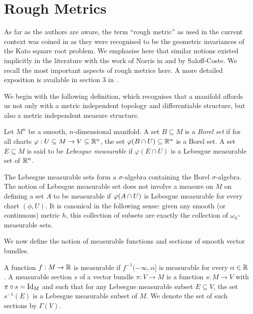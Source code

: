 \documentclass[a4paper, 12pt]{amsart}
\begin{document}
\section{Rough Metrics}
\label{sec:rough_metrics}

As far as the authors are aware, the term ``rough metric'' as used in the current context 
was coined in \cite{BRough} as they were 
recognised to be the geometric invariances of the Kato square root problem.
We emphasise here that similar notions existed implicitly in the 
literature with the work of Norris in \cite{Norris} 
and \cite{SC} by Saloff-Coste.
We recall the most important aspects of rough metrics here. 
A more detailed exposition is available in section 3 in \cite{BRough}.

We begin with the following definition, which recognises
that a manifold affords us not only with a metric independent 
topology and differentiable structure, but also a metric independent measure
structure.

\begin{defn}
\label{defn:borel_lebesgue}
Let \(M^n\) be a smooth, \(n\)-dimensional manifold. A set \(B \subseteq M\) is a \emph{Borel set} if for all charts \(\varphi : U \subseteq M \to V \subseteq \mathbb{R}^n\), the set \(\varphi(B \cap U) \subseteq \mathbb{R}^n\) is a Borel set. A set \(E \subseteq M\) is said to be \emph{Lebesgue measurable} if \(\varphi(E \cap U)\) is a Lebesgue measurable set of \(\mathbb{R}^n\).
\end{defn}

\begin{rem}
The Lebesgue measurable sets form a \(\sigma\)-algebra containing the Borel \(\sigma\)-algebra. The notion of Lebesgue measurable set does not involve a measure on \(M\)  on defining a set $A$ to be measurable if $\varphi(A \cap U)$ is Lebesgue measurable for
every chart $(\phi,U)$. It is canonical in the following sense: given any smooth (or continuous) metric $h$, this collection of subsets are exactly the collection of $\omega_h$-measurable sets.
\end{rem}

We now define the notion of measurable functions and sections of smooth vector bundles.

\begin{defn}
A function $f: M \to \mathbb{R}$ is measurable if $f^{-1}(-\infty, \alpha]$ is measurable for every $\alpha  \in \mathbb{R}$. A measurable section \(s\) of a vector bundle \(\pi : V \to M\) is a function \(s: M \to V\) with \(\pi \circ s = \operatorname{Id}_M\) and such that for any Lebesgue measurable subset \(E \subseteq V\), the set \(s^{-1}(E)\) is a Lebesgue measurable subset of \(M\).  We denote the set of such sections by $\Gamma(V)$.
\end{defn}
\end{document}
